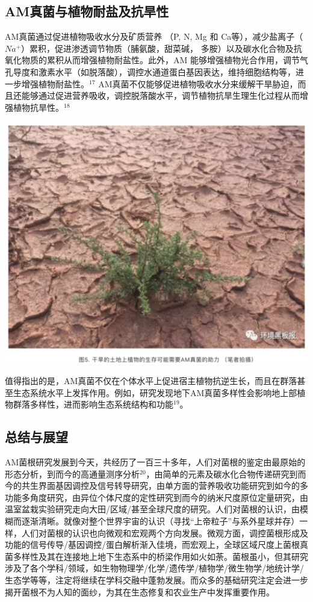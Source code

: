 \documentclass[]{book}
\begin{document}
\subsection{AM真菌与植物耐盐及抗旱性}\label{am}

AM真菌通过促进植物吸收水分及矿质营养 （P, N, Mg 和
Ca等），减少盐离子（\(Na^+\)）累积，促进渗透调节物质（脯氨酸，甜菜碱，
多胺）以及碳水化合物及抗氧化物质的累积从而增强植物耐盐性。此外，AM
能够增强植物光合作用，调节气孔导度和激素水平（如脱落酸），调控水通道蛋白基因表达，维持细胞结构等，进一步增强植物耐盐性。\(^{17}\)
AM真菌不仅能够促进植物吸收水分来缓解干旱胁迫，而且还能够通过促进营养吸收，调控脱落酸水平，调节植物抗旱生理生化过程从而增强植物抗旱性。\(^{18}\)

\includegraphics[width=6.67in]{images/am5}

值得指出的是，AM真菌不仅在个体水平上促进宿主植物抗逆生长，而且在群落甚至生态系统水平上发挥作用。例如，研究发现地下AM真菌多样性会影响地上部植物群落多样性，进而影响生态系统结构和功能\(^{19}\)。

\subsection{总结与展望}

AM菌根研究发展到今天，共经历了一百三十多年，人们对菌根的鉴定由最原始的形态分析，到而今的高通量测序分析\(^{20}\)，由简单的元素及碳水化合物传递研究到而今的共生界面基因调控及信号转导研究，由单方面的营养吸收功能研究到如今的多功能多角度研究，由异位个体尺度的定性研究到而今的纳米尺度原位定量研究，由温室盆栽实验研究走向大田/区域/甚至全球尺度的研究。人们对菌根的认识，由模糊而逐渐清晰。就像对整个世界宇宙的认识（寻找``上帝粒子''与系外星球并存）一样，人们对菌根的认识也向微观和宏观两个方向发展。微观方面，调控菌根形成及功能的信号传导/基因调控/蛋白解析渐入佳境，而宏观上，全球区域尺度上菌根真菌多样性及其在连接地上地下生态系中的桥梁作用如火如荼。菌根虽小，但其研究涉及了各个学科/领域，如生物物理学/化学/遗传学/植物学/微生物学/地统计学/生态学等等，注定将继续在学科交融中蓬勃发展。而众多的基础研究注定会进一步揭开菌根不为人知的面纱，为其在生态修复和农业生产中发挥重要作用。
\end{document}
